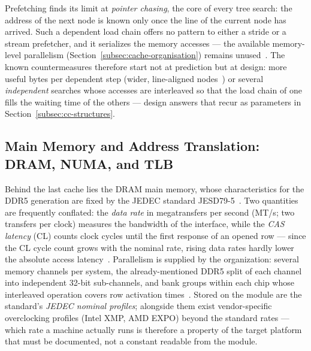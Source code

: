 Prefetching finds its limit at \emph{pointer chasing}, the core of every tree search: the address
of the next node is known only once the line of the current node has arrived. Such a dependent load
chain offers no pattern to either a stride or a stream prefetcher, and it serializes the memory
accesses --- the available memory-level parallelism (Section~\ref{subsec:cache-organisation})
remains unused~\cite{mittal2016prefetching}. The known countermeasures therefore start not at
prediction but at design: more useful bytes per dependent step (wider, line-aligned
nodes~\cite{chen2001prefetch}) or several \emph{independent} searches whose accesses are
interleaved so that the load chain of one fills the waiting time of the others --- design answers
that recur as parameters in Section~\ref{subsec:cc-structures}.

\subsection{Main Memory and Address Translation: DRAM, NUMA, and TLB}\label{subsec:memory-numa-tlb}
Behind the last cache lies the DRAM main memory, whose characteristics for the DDR5 generation are
fixed by the JEDEC standard JESD79-5~\cite{jedec_jesd79_5}. Two quantities are frequently
conflated: the \emph{data rate} in megatransfers per second (MT/s\@; two transfers per clock)
measures the bandwidth of the interface, while the \emph{CAS latency} (CL) counts clock cycles
until the first response of an opened row --- since the CL cycle count grows with the nominal rate,
rising data rates hardly lower the absolute access
latency~\cite{hennessy2019architecture,micron_ddr5}. Parallelism is supplied by the organization:
several memory channels per system, the already-mentioned DDR5 split of each channel into
independent 32-bit sub-channels, and bank groups within each chip whose interleaved operation
covers row activation times~\cite{jedec_jesd79_5,micron_ddr5}. Stored on the module are the
standard's \emph{JEDEC nominal profiles}; alongside them exist vendor-specific overclocking
profiles (Intel XMP, AMD EXPO) beyond the standard rates --- which rate a machine actually runs is
therefore a property of the target platform that must be documented, not a constant readable from
the module.

